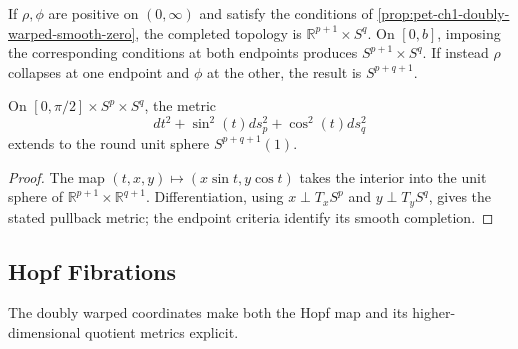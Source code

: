 \begin{remark}
  \label{rem:pet-ch1-doubly-warped-topologies}


  If $\rho,\phi$ are positive on $(0,\infty)$ and satisfy the conditions of
  \cref{prop:pet-ch1-doubly-warped-smooth-zero}, the completed topology is
  $\mathbb{R}^{p+1}\times S^q$. On $[0,b]$, imposing the corresponding
  conditions at both endpoints produces $S^{p+1}\times S^q$. If instead
  $\rho$ collapses at one endpoint and $\phi$ at the other, the result is
  $S^{p+q+1}$.
\end{remark}

\begin{example}
  \label{ex:pet-ch1-sphere-doubly-warped}


  On $[0,\pi/2]\times S^p\times S^q$, the metric
  \[
    dt^2+\sin^2(t)ds_p^2+\cos^2(t)ds_q^2
  \]
  extends to the round unit sphere $S^{p+q+1}(1)$.
\end{example}
\begin{proof}

  \sketch
  The map
  $(t,x,y)\mapsto(x\sin t,y\cos t)$ takes the interior into the unit sphere
  of $\mathbb{R}^{p+1}\times\mathbb{R}^{q+1}$. Differentiation, using
  $x\perp T_xS^p$ and $y\perp T_yS^q$, gives the stated pullback metric; the
  endpoint criteria identify its smooth completion.
\end{proof}

\subsection{Hopf Fibrations}

The doubly warped coordinates make both the Hopf map and its higher-dimensional
quotient metrics explicit.

